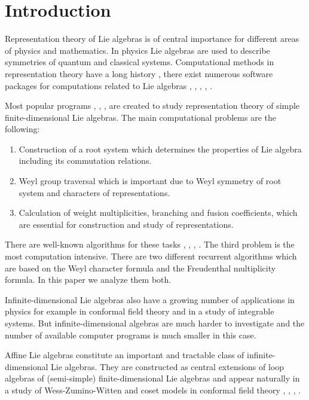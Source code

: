 \documentclass[preprint,12pt]{elsarticle}
\begin{document}
\section{Introduction}
\label{intro}

Representation theory of Lie algebras is of central importance for different areas of physics and mathematics. In physics Lie algebras are used to describe symmetries of quantum and classical systems. Computational methods in representation theory have a long history \cite{belinfante1989survey}, there exist numerous software packages for computations related to Lie algebras \cite{simplie}, \cite{vanleeuwen1994lsp}, \cite{stembridge1995mps,coxweyl}, \cite{fischbacher2002ilp}, \cite{Fuchs:1996dd}.

Most popular programs \cite{simplie}, \cite{vanleeuwen1994lsp}, \cite{fischbacher2002ilp}, \cite{coxweyl} are created to study representation theory of simple finite-dimensional Lie algebras. The main computational problems are the following:
\begin{enumerate}
\item Construction of a root system which determines the properties of Lie algebra including its commutation relations.
\item Weyl group traversal which is important due to Weyl symmetry of root system and characters of representations.
\item Calculation of weight multiplicities, branching and fusion coefficients, which are essential for construction and study of representations.
\end{enumerate}
There are well-known algorithms for these tasks \cite{moody1982fast}, \cite{stembridge2001computational}, \cite{belinfante1989survey}, \cite{casselman1994machine}.
The third problem is the most computation intensive. There are two different recurrent algorithms which are based on the Weyl character formula and the Freudenthal multiplicity formula. In this paper we analyze them both.

Infinite-dimensional Lie algebras also have a growing number of applications in physics for example in conformal field theory and in a study of  integrable systems. But infinite-dimensional algebras are much harder to investigate and the number of available computer programs is much smaller in this case.

Affine Lie algebras \cite{kac1990idl} constitute an important and tractable class of infinite-dimensional Lie algebras. They are constructed as central extensions of loop algebras of (semi-simple) finite-dimensional Lie algebras and appear naturally in a study of Wess-Zumino-Witten and coset models in conformal field theory \cite{Walton:1999xc}, \cite{difrancesco1997cft}, \cite{Goddard198588}, \cite{Dunbar:1992gh}.
\end{document}
